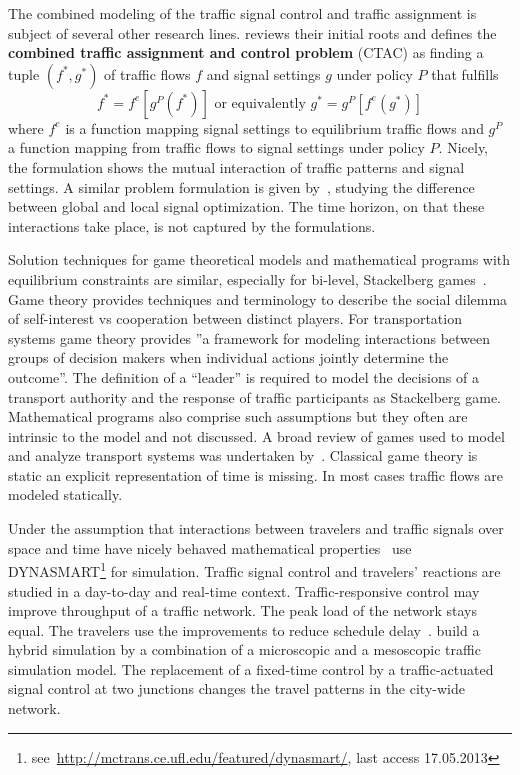 The combined modeling of the traffic signal control and traffic assignment is subject of several other research lines. 
\citet{Meneguzzer1997ModelReviewTrafficAssignmentSignalControl} reviews their initial roots and defines the {\bf combined traffic assignment and control problem} (CTAC) as finding a tuple $(f^{*}, g^{*})$ of traffic flows $f$ and signal settings $g$ under policy $P$ that fulfills  
\[
f^{*} = f^{e}[g^{P}(f^{*})] \mbox{  or  equivalently } g^{*} = g^{P}[f^{e}(g^{*})]
\]
where $f^{e}$ is a function mapping signal settings to equilibrium traffic flows and $g^{P}$ a function mapping from traffic flows to signal settings under policy $P$.  
Nicely, the formulation shows the mutual interaction of traffic patterns and signal settings. 
A similar problem formulation is given by~\citet{CascettaGalloMontella2006SignalsWithStochAssignment}, studying the difference between global and local signal optimization. 
The time horizon, on that these interactions take place, is not captured by the formulations. 

Solution techniques for game theoretical models and mathematical programs with equilibrium constraints are similar, especially for bi-level, Stackelberg games~\citep{Hollander2006NonCooperativeGamesTransport}. 
Game theory provides techniques and terminology to describe the social dilemma of self-interest vs cooperation between distinct players. 
For transportation systems game theory provides ''a framework for modeling interactions between groups of decision makers when individual actions jointly determine the outcome''\citep{Fisk1984GameTheoryTransportationSystems}. 
The definition of a ``leader'' is required to model the decisions of a transport authority and the response of traffic participants as Stackelberg game. 
%
Mathematical programs also comprise such assumptions but they often are intrinsic to the model and not discussed. 
%
A broad review of games used to model and analyze transport systems was undertaken by~\citet{Hollander2006NonCooperativeGamesTransport}. 
Classical game theory is static an explicit representation of time is missing. 
In most cases traffic flows are modeled statically. 

Under the assumption that interactions between travelers and traffic signals over space and time have nicely behaved mathematical properties~\citet{Hu1997D2DFlowEvolutionReactiveSignalsDynasmart} use DYNASMART\footnote{see~\url{http://mctrans.ce.ufl.edu/featured/dynasmart/}, last access 17.05.2013} for simulation. 
Traffic signal control and travelers' reactions are studied in a day-to-day and real-time context. 
Traffic-responsive control may improve throughput of a traffic network. 
The peak load of the network stays equal. 
The travelers use the improvements to reduce schedule delay~\citep{Hu1997D2DFlowEvolutionReactiveSignalsDynasmart}. 
\citet{Burghout2007HybridSimulationAdaptiveSignal} build a hybrid simulation by a combination of a microscopic and a mesoscopic traffic simulation model. 
The replacement of a fixed-time control by a traffic-actuated signal control at two junctions changes the travel patterns in the city-wide network. 


